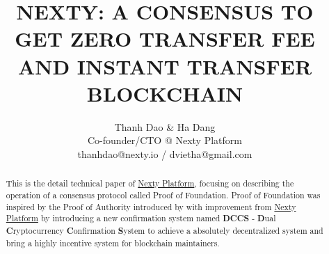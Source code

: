 \documentclass[12pt,oneside]{amsart}
\title{NEXTY: A CONSENSUS TO GET ZERO TRANSFER FEE AND INSTANT TRANSFER BLOCKCHAIN}
\author{
	Thanh Dao \& Ha Dang \\
	Co-founder/CTO @ Nexty Platform \\
	thanhdao@nexty.io / dvietha@gmail.com
}
\date{} %
\begin{document}
\pagecolor{pagecolor}
\begin{abstract}
This is the detail technical paper of \href{https://nexty.io}{Nexty Platform}, focusing on describing the operation of a consensus protocol called Proof of Foundation. Proof of Foundation was inspired by the Proof of Authority introduced by \cite{clique} with improvement from \href{https://nexty.io}{Nexty Platform} by introducing a new confirmation system named \textbf{DCCS} - \textbf{D}ual \textbf{C}ryptocurrency \textbf{C}onfirmation \textbf{S}ystem to achieve a absolutely decentralized system and bring a highly incentive system for blockchain maintainers.
\end{abstract}

\maketitle
\end{document}
